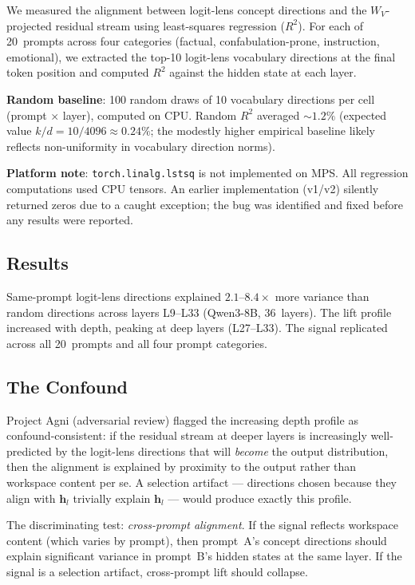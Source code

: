 \documentclass[11pt,a4paper]{article}
\begin{document}
We measured the alignment between logit-lens concept directions and
the $W_V$-projected residual stream using least-squares regression
($R^2$). For each of 20~prompts across four categories (factual,
confabulation-prone, instruction, emotional), we extracted the
top-10 logit-lens vocabulary directions at the final token position and
computed $R^2$ against the hidden state at each layer.

\textbf{Random baseline}: 100 random draws of 10 vocabulary directions
per cell (prompt $\times$ layer), computed on CPU. Random $R^2$
averaged ${\sim}1.2\%$ (expected value $k/d = 10/4096 \approx 0.24\%$;
the modestly higher empirical baseline likely reflects non-uniformity
in vocabulary direction norms).

\textbf{Platform note}: \texttt{torch.linalg.lstsq} is not implemented
on MPS. All regression computations used CPU tensors. An earlier
implementation (v1/v2) silently returned zeros due to a caught
exception; the bug was identified and fixed before any results were
reported.

\subsection{Results}

Same-prompt logit-lens directions explained $2.1$--$8.4\times$ more
variance than random directions across layers L9--L33 (Qwen3-8B,
36~layers). The lift profile increased with depth, peaking at deep
layers (L27--L33). The signal replicated across all 20~prompts and all
four prompt categories.

\subsection{The Confound}

Project Agni (adversarial review) flagged the increasing depth profile
as confound-consistent: if the residual stream at deeper layers is
increasingly well-predicted by the logit-lens directions that will
\emph{become} the output distribution, then the alignment is explained
by proximity to the output rather than workspace content per se. A
selection artifact --- directions chosen because they align with
$\mathbf{h}_l$ trivially explain $\mathbf{h}_l$ --- would produce
exactly this profile.

The discriminating test: \emph{cross-prompt alignment}. If the signal
reflects workspace content (which varies by prompt), then prompt~A's
concept directions should explain significant variance in prompt~B's
hidden states at the same layer. If the signal is a selection artifact,
cross-prompt lift should collapse.
\end{document}
